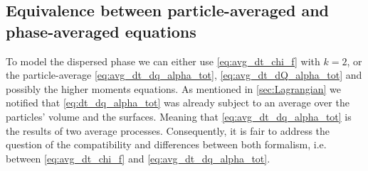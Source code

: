 
\subsection{Equivalence between particle-averaged and phase-averaged equations}

To model the dispersed phase we can either use \ref{eq:avg_dt_chi_f} with $k=2$, or the particle-average \ref{eq:avg_dt_dq_alpha_tot}, \ref{eq:avg_dt_dQ_alpha_tot} and possibly the higher moments equations. 
As mentioned in \ref{sec:Lagrangian} we notified that \ref{eq:dt_dq_alpha_tot} was already subject to an average over the particles' volume and the surfaces. 
Meaning that \ref{eq:avg_dt_dq_alpha_tot} is the results of two average processes. 
Consequently, it is fair to address the question of the compatibility and differences between both formalism, i.e. between \ref{eq:avg_dt_chi_f} and \ref{eq:avg_dt_dq_alpha_tot}. 

